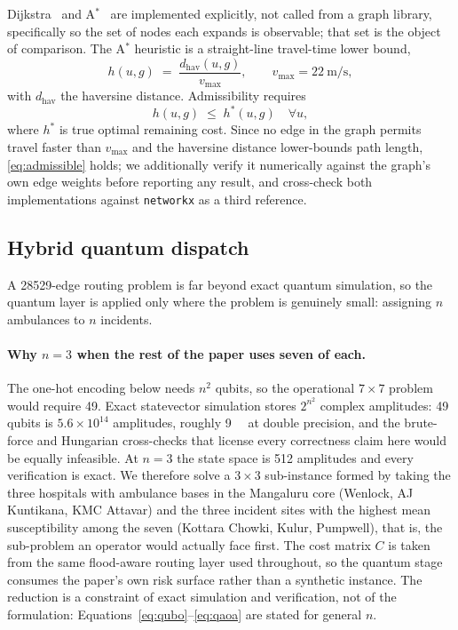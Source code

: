 \documentclass[11pt,a4paper]{article}
\begin{document}
Dijkstra~\citep{dijkstra1959} and A$^\ast$~\citep{hart1968} are implemented
explicitly, not called from a graph library, specifically so the set of
nodes each expands is observable; that set is the object of comparison. The
A$^\ast$ heuristic is a straight-line travel-time lower bound,
\begin{equation}
h(u,g) \;=\; \frac{d_{\mathrm{hav}}(u,g)}{v_{\max}},
\qquad v_{\max}=\SI{22}{\metre\per\second},
\label{eq:heuristic}
\end{equation}
with $d_{\mathrm{hav}}$ the haversine distance. Admissibility requires
\begin{equation}
h(u,g) \;\le\; h^{*}(u,g) \quad \forall u,
\label{eq:admissible}
\end{equation}
where $h^{*}$ is true optimal remaining cost. Since no edge in the graph permits
travel faster than $v_{\max}$ and the haversine distance lower-bounds path
length, \eqref{eq:admissible} holds; we additionally verify it numerically
against the graph's own edge weights before reporting any result, and cross-check
both implementations against \texttt{networkx} as a third reference.

\subsection{Hybrid quantum dispatch}
\label{sec:method-qaoa}
A \num{28529}-edge routing problem is far beyond exact quantum simulation, so the
quantum layer is applied only where the problem is genuinely small: assigning
$n$ ambulances to $n$ incidents.

\paragraph{Why $n=3$ when the rest of the paper uses seven of each.}
The one-hot encoding below needs $n^2$ qubits, so the operational $7\times7$
problem would require 49. Exact statevector simulation stores $2^{n^2}$ complex
amplitudes: 49 qubits is $5.6\times10^{14}$ amplitudes, roughly \SI{9}{\peta\byte}
at double precision, and the brute-force and Hungarian cross-checks that license
every correctness claim here would be equally infeasible. At $n=3$ the state
space is 512 amplitudes and every verification is exact. We therefore solve a
$3\times3$ sub-instance formed by taking the three hospitals with ambulance
bases in the Mangaluru core (Wenlock, AJ Kuntikana, KMC Attavar) and the three
incident sites with the highest mean susceptibility among the seven (Kottara
Chowki, Kulur, Pumpwell), that is, the sub-problem an operator would actually
face first. The cost matrix $C$ is taken from the same flood-aware routing layer
used throughout, so the quantum stage consumes the paper's own risk surface
rather than a synthetic instance. The reduction is a constraint of exact
simulation and verification, not of the formulation:
Equations~\eqref{eq:qubo}--\eqref{eq:qaoa} are stated for general $n$.
\end{document}
